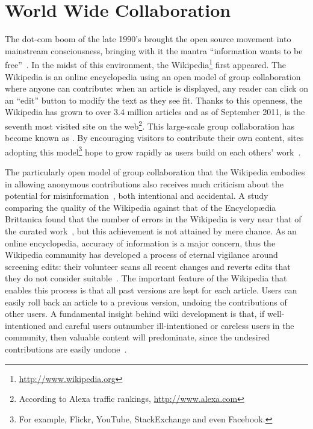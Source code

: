 \section{World Wide Collaboration}

The dot-com boom of the late 1990's brought the open source movement into
mainstream consciousness, bringing with it the mantra ``information
wants to be free''~\cite{wiki:Information-free}.
In the midst of this environment, the
Wikipedia\footnote{\url{http://www.wikipedia.org}}
first appeared.
The Wikipedia
is an online encyclopedia using an open model of group collaboration
where anyone can contribute: when an article is
displayed, any reader can click on an ``edit'' button to modify
the text as they see fit.
Thanks to this openness, the Wikipedia has grown to
over 3.4 million articles and as of September 2011,
is the seventh most visited site on the
web\footnote{According to Alexa traffic rankings, \url{http://www.alexa.com}}.
This large-scale group collaboration
has become known as .
By encouraging visitors to contribute their own content,
sites adopting this model\footnote{For example,
Flickr, YouTube, StackExchange and even Facebook.}
hope to grow rapidly as users build on each others' work~\cite{Taylor2007}.



The particularly open model of group collaboration that the Wikipedia embodies
in allowing anonymous contributions
also receives much criticism about the potential for
misinformation~\cite{Seigenthaler05,NewYorkTimes05a,Lehmann2006,Hickman2006,Davis2006,Stross2006,Schiff2006,BBC2007},
both intentional and accidental.
A study comparing the quality of the Wikipedia against that
of the Encyclop{\ae}dia Brittanica found that the number of errors
in the Wikipedia is very near that of the curated work~\cite{Giles2005},
but this achievement is not attained by mere chance.
As an online encyclopedia, accuracy of information is a major concern,
thus the Wikipedia community has developed a process
of eternal vigilance around screening edits: their volunteer  scans all recent changes and reverts edits that they do not
consider suitable~\cite{wiki:RCPatrol}.
The important feature of the Wikipedia that enables this
process is that all past versions are kept for each article.
Users can easily roll back an article to a previous version,
undoing the contributions of other users.
A fundamental insight behind wiki development is that,
if well-intentioned and careful users outnumber ill-intentioned
or careless users in the community, then valuable content will predominate,
since the undesired contributions are easily undone~\cite{Leuf2001}.

